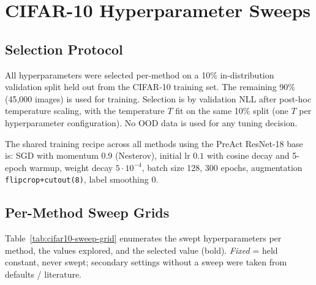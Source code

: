 
\section{CIFAR-10 Hyperparameter Sweeps}
\label{app:cifar10-sweeps}

\subsection{Selection Protocol}
\label{app:cifar10-protocol}

All hyperparameters were selected per-method on a 10\% in-distribution validation
split held out from the CIFAR-10 training set. The remaining 90\% (45,000 images)
is used for training. Selection is by validation NLL after post-hoc temperature
scaling, with the temperature $T$ fit on the same 10\% split (one $T$ per
hyperparameter configuration). No OOD data is used for any tuning decision.

The shared training recipe across all methods using the PreAct ResNet-18 base is:
SGD with momentum 0.9 (Nesterov), initial lr $0.1$ with cosine decay and 5-epoch
warmup, weight decay $5 \cdot 10^{-4}$, batch size 128, 300 epochs, augmentation
\texttt{flipcrop+cutout(8)}, label smoothing 0.

\subsection{Per-Method Sweep Grids}
\label{app:cifar10-grid}

Table~\ref{tab:cifar10-sweep-grid} enumerates the swept hyperparameters per
method, the values explored, and the selected value (bold). \textit{Fixed} =
held constant, never swept; secondary settings without a sweep were taken from
defaults / literature.

